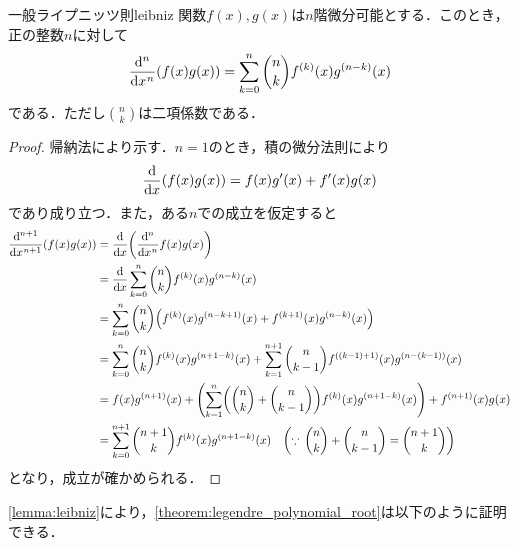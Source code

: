 \documentclass[a4paper]{ltjsarticle}
\theoremstyle{definition}
\DeclarePairedDelimiter{\pqty}{\lparen}{\rparen}
\begin{document}
\begin{lemma}{一般ライプニッツ則}{leibniz}
  関数$f(x), g(x)$は$n$階微分可能とする．このとき，正の整数$n$に対して
  \[
    \diff*[n]{\pqty*{f(x)g(x)}}{x} = \sum_{k=0}^n \binom{n}{k} f^{(k)}(x) g^{(n-k)}(x)
  \]
  である．ただし$\binom{n}{k}$は二項係数である．
\end{lemma}

\begin{proof}
  帰納法により示す．$n=1$のとき，積の微分法則により
  \[
    \diff*{\pqty*{f(x)g(x)}}{x} = f(x)g'(x) + f'(x)g(x)
  \]
  であり成り立つ．また，ある$n$での成立を仮定すると
  \begin{align*}
    \diff*[n+1]{\pqty*{f(x)g(x)}}{x}
    &= \diff*{\pqty*{\diff*[n]{f(x)g(x)}{x}}}{x} \\
    &= \diff*{\sum_{k=0}^n \binom{n}{k} f^{(k)}(x) g^{(n-k)}(x)}{x} \\
    &= \sum_{k=0}^n \binom{n}{k} \pqty*{f^{(k)}(x) g^{(n-k+1)}(x) + f^{(k+1)}(x) g^{(n-k)}(x)} \\
    &= \sum_{k=0}^{n} \binom{n}{k} f^{(k)}(x) g^{(n+1-k)}(x) + \sum_{k=1}^{n+1} \binom{n}{k-1} f^{((k-1)+1)}(x) g^{(n-(k-1))}(x) \\
    &= f(x)g^{(n+1)}(x) + \pqty*{\sum_{k=1}^{n} \pqty*{\binom{n}{k} + \binom{n}{k-1}} f^{(k)}(x) g^{(n+1-k)}(x)} + f^{(n+1)}(x)g(x) \\
    &= \sum_{k=0}^{n+1} \binom{n+1}{k} f^{(k)}(x) g^{(n+1-k)}(x) \quad \pqty*{\because\, \binom{n}{k} + \binom{n}{k-1} = \binom{n+1}{k}}
  \end{align*}
  となり，成立が確かめられる．
\end{proof}

\cref{lemma:leibniz}により，\cref{theorem:legendre_polynomial_root}は以下のように証明できる．
\end{document}
